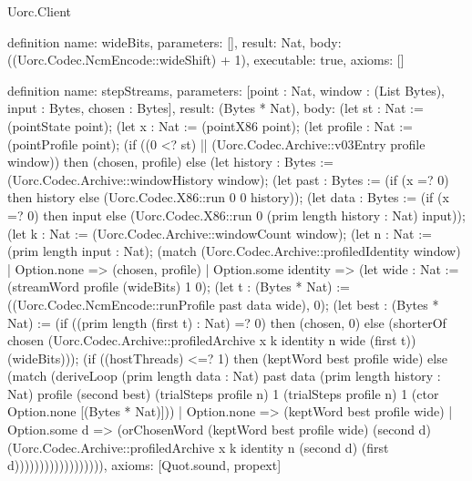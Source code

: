 \begin{lexlean}{Uorc.Client}
\begin{semanticmodule}
definition{
  name: wideBits,
  parameters: [],
  result: Nat,
  body: ((Uorc.Codec.NcmEncode::wideShift) + 1),
  executable: true,
  axioms: []
}

definition{
  name: stepStreams,
  parameters: [point : Nat, window : (List Bytes), input : Bytes, chosen : Bytes],
  result: (Bytes * Nat),
  body: (let st : Nat := (pointState point); (let x : Nat := (pointX86 point); (let profile : Nat := (pointProfile point); (if ((0 <? st) || (Uorc.Codec.Archive::v03Entry profile window)) then (chosen, profile) else (let history : Bytes := (Uorc.Codec.Archive::windowHistory window); (let past : Bytes := (if (x =? 0) then history else (Uorc.Codec.X86::run 0 0 history)); (let data : Bytes := (if (x =? 0) then input else (Uorc.Codec.X86::run 0 (prim length history : Nat) input)); (let k : Nat := (Uorc.Codec.Archive::windowCount window); (let n : Nat := (prim length input : Nat); (match (Uorc.Codec.Archive::profiledIdentity window)
    | Option.none => (chosen, profile)
    | Option.some identity => (let wide : Nat := (streamWord profile (wideBits) 1 0); (let t : (Bytes * Nat) := ((Uorc.Codec.NcmEncode::runProfile past data wide), 0); (let best : (Bytes * Nat) := (if ((prim length (first t) : Nat) =? 0) then (chosen, 0) else (shorterOf chosen (Uorc.Codec.Archive::profiledArchive x k identity n wide (first t)) (wideBits))); (if ((hostThreads) <=? 1) then (keptWord best profile wide) else (match (deriveLoop (prim length data : Nat) past data (prim length history : Nat) profile (second best) (trialSteps profile n) 1 (trialSteps profile n) 1 (ctor Option.none [(Bytes * Nat)]))
        | Option.none => (keptWord best profile wide)
        | Option.some d => (orChosenWord (keptWord best profile wide) (second d) (Uorc.Codec.Archive::profiledArchive x k identity n (second d) (first d)))))))))))))))))),
  axioms: [Quot.sound, propext]
}


\end{semanticmodule}
\end{lexlean}

